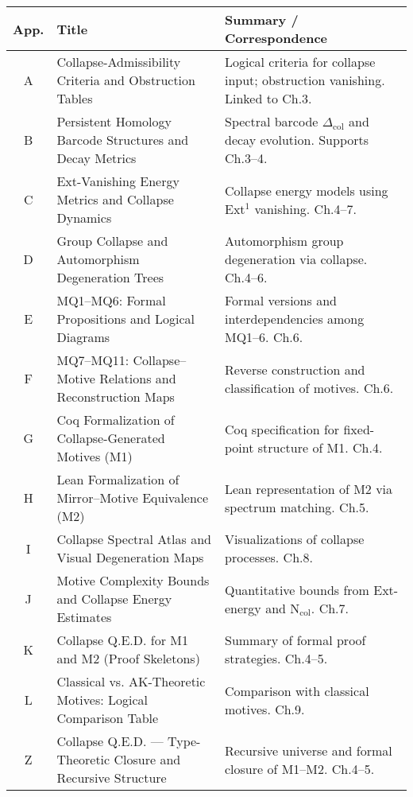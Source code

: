 \documentclass[11pt]{article}
\begin{document}
\begin{center}
\begin{tabularx}{\textwidth}{|c|>{\raggedright\arraybackslash}X|>{\raggedright\arraybackslash}X|}
\hline
\textbf{App.} & \textbf{Title} & \textbf{Summary / Correspondence} \\
\hline
A & Collapse-Admissibility Criteria and Obstruction Tables & Logical criteria for collapse input; obstruction vanishing. Linked to Ch.3. \\
\hline
B & Persistent Homology Barcode Structures and Decay Metrics & Spectral barcode $\Delta_{\mathrm{col}}$ and decay evolution. Supports Ch.3–4. \\
\hline
C & Ext-Vanishing Energy Metrics and Collapse Dynamics & Collapse energy models using Ext$^1$ vanishing. Ch.4–7. \\
\hline
D & Group Collapse and Automorphism Degeneration Trees & Automorphism group degeneration via collapse. Ch.4–6. \\
\hline
E & MQ1–MQ6: Formal Propositions and Logical Diagrams & Formal versions and interdependencies among MQ1–6. Ch.6. \\
\hline
F & MQ7–MQ11: Collapse–Motive Relations and Reconstruction Maps & Reverse construction and classification of motives. Ch.6. \\
\hline
G & Coq Formalization of Collapse-Generated Motives (M1) & Coq specification for fixed-point structure of M1. Ch.4. \\
\hline
H & Lean Formalization of Mirror–Motive Equivalence (M2) & Lean representation of M2 via spectrum matching. Ch.5. \\
\hline
I & Collapse Spectral Atlas and Visual Degeneration Maps & Visualizations of collapse processes. Ch.8. \\
\hline
J & Motive Complexity Bounds and Collapse Energy Estimates & Quantitative bounds from Ext-energy and N$_{\mathrm{col}}$. Ch.7. \\
\hline
K & Collapse Q.E.D. for M1 and M2 (Proof Skeletons) & Summary of formal proof strategies. Ch.4–5. \\
\hline
L & Classical vs. AK-Theoretic Motives: Logical Comparison Table & Comparison with classical motives. Ch.9. \\
\hline
Z & Collapse Q.E.D. — Type-Theoretic Closure and Recursive Structure & Recursive universe and formal closure of M1–M2. Ch.4–5. \\
\hline
\end{tabularx}
\end{center}
\end{document}
